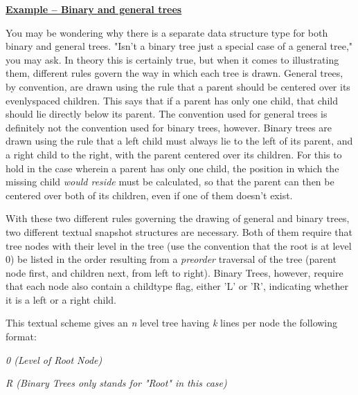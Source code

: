 \documentclass[12pt]{article}
\begin{document}
\begin{flushleft}
\textbf{\uline{{\footnotesize{}Example -- Binary and general trees}}}\textbf{{\footnotesize{} }}
\end{flushleft}



{\footnotesize{}You may be wondering why there is a separate data structure type for both binary and general trees.  "Isn't a binary tree just a special case of a general tree," you may ask.  In theory this is certainly true, but when it comes to illustrating  them, different rules govern the way in which each tree is drawn.  General trees, by convention, are drawn using the rule that a parent should be centered over its  evenlyspaced children.  This says that if a parent has only one child, that child should lie directly below its parent.  The convention used for general trees is definitely not the convention used for binary trees, however.  Binary trees are drawn using the rule that a left child must always lie to the left of its parent, and a right child to the right, with the parent centered over its children.  For this to hold in the case wherein a parent has only one child,  the position in which the missing child }\textit{{\footnotesize{}would reside}}{\footnotesize{} must be calculated, so that the parent can then be centered over both of its children, even if one of them doesn't exist. }



{\footnotesize{}With these two different rules governing the drawing of general and binary trees, two different textual snapshot structures are necessary.  Both of them require that tree nodes with their level in the tree (use the convention that the root is at level 0) be listed in the order resulting from a }\textit{{\footnotesize{}preorder}}{\footnotesize{} traversal of the tree (parent node first, and children next, from left to right).   Binary Trees, however, require that each node also contain a childtype flag, either 'L' or 'R',  indicating whether it is a left or a  right child.     }



{\footnotesize{}This textual scheme gives an }\textit{{\footnotesize{}n}}{\footnotesize{} level tree having }\textit{{\footnotesize{}k}}{\footnotesize{} lines per node the following format:}



\textit{{\footnotesize{}                0  (Level of Root Node) }}

\textit{{\footnotesize{}                R  (Binary Trees only  stands for "Root" in this case)}}
\end{document}
